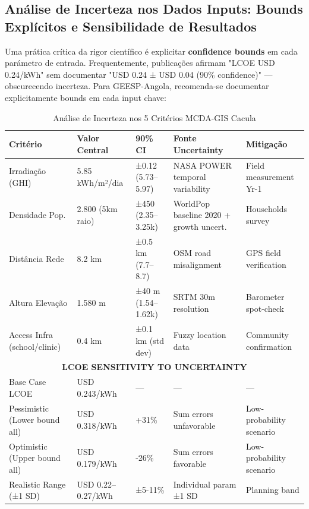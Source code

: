 \documentclass[12pt, a4paper]{article}
\begin{document}
\subsection{Análise de Incerteza nos Dados Inputs: Bounds Explícitos e Sensibilidade de Resultados}

Uma prática crítica da rigor científico é explicitar \textbf{confidence bounds} em cada parámetro de entrada. Frequentemente, publicações afirmam "LCOE USD 0.24/kWh" sem documentar "USD 0.24 ± USD 0.04 (90\% confidence)" — obscurecendo incerteza. Para GEESP-Angola, recomenda-se documentar explicitamente bounds em cada input chave:

\begin{table}[H]
\centering
\caption{Análise de Incerteza nos 5 Critérios MCDA-GIS Cacula}
\label{tab:uncertainty_bounds}
\small
\begin{tabular}{|l|l|l|l|l|}
\hline
\textbf{Critério} & \textbf{Valor Central} & \textbf{90\% CI} & \textbf{Fonte Uncertainty} & \textbf{Mitigação} \\
\hline
Irradiação (GHI) & 5.85 kWh/m²/dia & ±0.12 (5.73–5.97) & NASA POWER temporal variability & Field measurement Yr-1 \\
Densidade Pop. & 2.800 (5km raio) & ±450 (2.35–3.25k) & WorldPop baseline 2020 + growth uncert. & Households survey \\
Distância Rede & 8.2 km & ±0.5 km (7.7–8.7) & OSM road misalignment & GPS field verification \\
Altura Elevação & 1.580 m & ±40 m (1.54–1.62k) & SRTM 30m resolution & Barometer spot-check \\
Access Infra (school/clinic) & 0.4 km & ±0.1 km (std dev) & Fuzzy location data & Community confirmation \\
\hline
\multicolumn{5}{|c|}{\textbf{LCOE SENSITIVITY TO UNCERTAINTY}} \\
\hline
Base Case LCOE & USD 0.243/kWh & — & — & — \\
Pessimistic (Lower bound all) & USD 0.318/kWh & +31\% & Sum errors unfavorable & Low-probability scenario \\
Optimistic (Upper bound all) & USD 0.179/kWh & -26\% & Sum errors favorable & Low-probability scenario \\
Realistic Range (±1 SD) & USD 0.22–0.27/kWh & ±5-11\% & Individual param ±1 SD & Planning band \\
\hline
\end{tabular}
\end{table}
\end{document}
